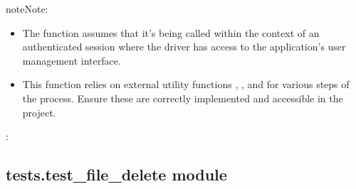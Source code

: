 \documentclass[letterpaper,10pt,english]{sphinxmanual}
\begin{document}
\begin{fulllineitems}
\begin{quote}
\begin{description}
\end{description}\end{quote}

\begin{sphinxadmonition}{note}{Note:}\begin{itemize}
\item {} 
\sphinxAtStartPar
The function assumes that it’s being called within the context of an authenticated session where
the driver has access to the application’s user management interface.

\item {} 
\sphinxAtStartPar
This function relies on external utility functions , ,
and  for various steps of the process. Ensure these are correctly implemented
and accessible in the project.

\end{itemize}
\end{sphinxadmonition}

\sphinxAtStartPar
{}:

\begin{sphinxVerbatim}[commandchars=\\\{\}]
   
  
  
   
\end{sphinxVerbatim}

\end{fulllineitems}



\subsection{tests.test\_file\_delete module}
\label{\detokenize{tests:module-tests.test_file_delete}}\label{\detokenize{tests:tests-test-file-delete-module}}
\end{document}

